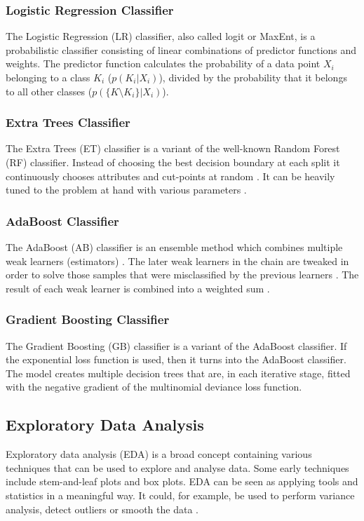 \subsubsection{Logistic Regression Classifier}
The Logistic Regression (LR) classifier, also called logit or MaxEnt, is a probabilistic classifier consisting of linear combinations of predictor functions and weights.
The predictor function calculates the probability of a data point $X_i$ belonging to a class $K_i$ ($p(K_i|X_i)$), divided by the probability that it belongs to all other classes ($p(\{K \setminus K_i\} | X_i)$).

\subsubsection{Extra Trees Classifier}
The Extra Trees (ET) classifier is a variant of the well-known Random Forest (RF) classifier.
Instead of choosing the best decision boundary at each split it continuously chooses attributes and cut-points at random \cite{Geurts2006}.
It can be heavily tuned to the problem at hand with various parameters \cite{Geurts2006}.

\subsubsection{AdaBoost Classifier}
The AdaBoost (AB) classifier is an ensemble method which combines multiple weak learners (estimators) \cite{Freund1995}.
The later weak learners in the chain are tweaked in order to solve those samples that were misclassified by the previous learners \cite{Freund1995}.
The result of each weak learner is combined into a weighted sum \cite{Freund1995}.

\subsubsection{Gradient Boosting Classifier}
The Gradient Boosting (GB) classifier is a variant of the AdaBoost classifier.
If the exponential loss function is used, then it turns into the AdaBoost classifier.
The model creates multiple decision trees that are, in each iterative stage, fitted with the negative gradient of the multinomial deviance loss function.

\subsection{Exploratory Data Analysis}
Exploratory data analysis (EDA) is a broad concept containing various techniques \cite{Hoaglin2003, Tukey1977, Velleman1981} that can be used to explore and analyse data.
Some early techniques include stem-and-leaf plots and box plots.
EDA can be seen as applying tools and statistics in a meaningful way.
It could, for example, be used to perform variance analysis, detect outliers or smooth the data \cite{Hoaglin2003, Tukey1977, Velleman1981}.


